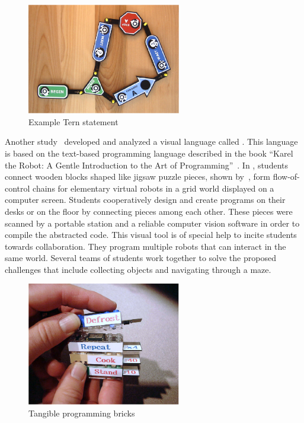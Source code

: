 \begin{figure}
  \centering
  \includegraphics[width=0.6\textwidth]{img/relworks/tern.png}
  \caption{Example Tern statement~\cite{HornRobert:2007}}
  \label{fig:tern}
\end{figure}

Another study~\cite{HornRobert:2007} developed and analyzed a visual
language called \tern. This language is based on the text\hyp{}based
programming language described in the book ``Karel the Robot: A Gentle
Introduction to the Art of Programming''~\cite{Pattis:1994}. In \tern,
students connect wooden blocks shaped like jigsaw puzzle pieces, shown
by~, form flow\hyp{}of\hyp{}control chains for
elementary virtual robots in a grid world displayed on a computer
screen. Students cooperatively design and create programs on their
desks or on the floor by connecting pieces among each other. These
pieces were scanned by a portable station and a reliable computer
vision software in order to compile the abstracted code. This visual
tool is of special help to incite students towards collaboration. They
program multiple robots that can interact in the same world. Several
teams of students work together to solve the proposed challenges that
include collecting objects and navigating through a maze.

\begin{figure}[h!]
  \centering
  \includegraphics[width=0.6\textwidth]{img/relworks/bricks.png}
  \caption{Tangible programming bricks~\cite{McNerney:2000}}
  \label{fig:bricks}
\end{figure}


